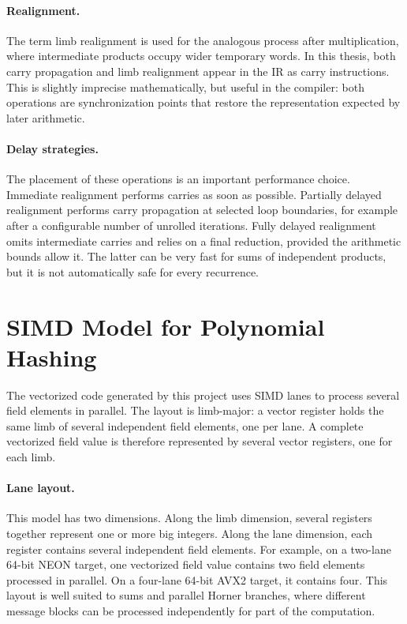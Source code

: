 \paragraph{Realignment.}
The term limb realignment is used for the analogous process after multiplication, where intermediate products occupy wider temporary words. In this thesis, both carry propagation and limb realignment appear in the IR as carry instructions. This is slightly imprecise mathematically, but useful in the compiler: both operations are synchronization points that restore the representation expected by later arithmetic.

\paragraph{Delay strategies.}
The placement of these operations is an important performance choice. Immediate realignment performs carries as soon as possible. Partially delayed realignment performs carry propagation at selected loop boundaries, for example after a configurable number of unrolled iterations. Fully delayed realignment omits intermediate carries and relies on a final reduction, provided the arithmetic bounds allow it. The latter can be very fast for sums of independent products, but it is not automatically safe for every recurrence.

\section{SIMD Model for Polynomial Hashing}
\label{sec:simd-model}

The vectorized code generated by this project uses SIMD lanes to process several field elements in parallel. The layout is limb-major: a vector register holds the same limb of several independent field elements, one per lane. A complete vectorized field value is therefore represented by several vector registers, one for each limb.

\paragraph{Lane layout.}
This model has two dimensions. Along the limb dimension, several registers together represent one or more big integers. Along the lane dimension, each register contains several independent field elements. For example, on a two-lane 64-bit NEON target, one vectorized field value contains two field elements processed in parallel. On a four-lane 64-bit AVX2 target, it contains four. This layout is well suited to sums and parallel Horner branches, where different message blocks can be processed independently for part of the computation.
